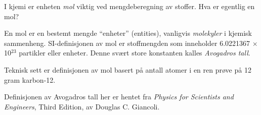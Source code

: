 

I kjemi er enheten {\it mol} viktig ved mengdeberegning av stoffer. Hva er egentlig en mol?







En mol er en bestemt mengde ``enheter'' (entities), vanligvis {\it molekyler} i kjemisk sammenheng. SI-definisjonen av mol er stoffmengden som inneholder 6.0221367 $\times$ 10$^{23}$ partikler eller enheter. Denne svært store konstanten kalles {\it Avogadros tall}.







Teknisk sett er definisjonen av mol basert på antall atomer i en ren prøve på 12 gram karbon-12.

\vskip 10pt

Definisjonen av Avogadros tall her er hentet fra {\it Physics for Scientists and Engineers}, Third Edition, av Douglas C. Giancoli.



